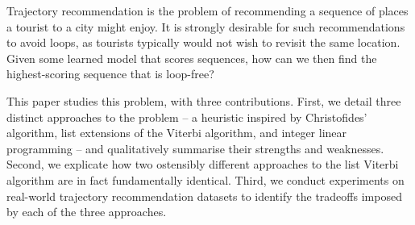 
Trajectory recommendation is the problem of recommending a sequence of places a tourist to a city might enjoy.
It is strongly desirable for such recommendations to avoid loops, as tourists typically would not wish to revisit the same location.
Given some learned model that scores sequences, how can we then find the highest-scoring sequence that is loop-free?

This paper studies this problem, with three contributions.
First, we detail three distinct approaches to the problem -- a heuristic inspired by Christofides' algorithm, list extensions of the Viterbi algorithm, and integer linear programming -- and qualitatively summarise their strengths and weaknesses.
Second, we explicate how two ostensibly different approaches to the list Viterbi algorithm \citep{seshadri1994list,nilsson2001sequentially} are in fact fundamentally identical.
Third, we conduct experiments on real-world trajectory recommendation datasets to identify the tradeoffs imposed by each of the three approaches.

